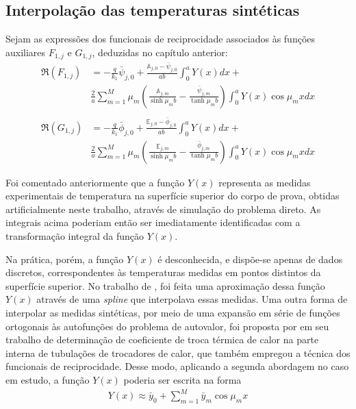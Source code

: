 \subsection{Interpolação das temperaturas sintéticas}\label{secao_interpolacao}
Sejam as expressões dos funcionais de reciprocidade associados às funções auxiliares $F_{1, j}$ e $G_{1, j}$, deduzidas no capítulo anterior:
\begin{align}
\Re(F_{1,j})
& =
-\frac{q}{k_1}\bar{\psi}_{j,0} + \frac{\mathbb{A}_{j,0} - \bar{\psi}_{j,0}}{ab}\int_0^a Y(x)dx + \nonumber \\
& \frac{2}{a}\sum_{m=1}^M \mu_m \left(\frac{\mathbb{A}_{j,m}}{\sinh\mu_m b} - \frac{\bar{\psi}_{j, m}}{\tanh\mu_m b}\right)\int_0^a Y(x)\cos\mu_m x dx
\label{calculo_FR_F1_antes_a} \\ \nonumber \\
\Re(G_{1,j})
& =
-\frac{q}{k_1}\bar{\phi}_{j,0} + \frac{\mathbb{E}_{j,0} - \bar{\phi}_{j,0}}{ab}\int_0^a Y(x)dx + \nonumber \\
& \frac{2}{a}\sum_{m=1}^M \mu_m \left(\frac{\mathbb{E}_{j,m}}{\sinh\mu_m b} - \frac{\bar{\phi}_{j, m}}{\tanh\mu_m b}\right)\int_0^a Y(x)\cos\mu_m x dx
\label{calculo_FR_G1_antes_a}
\end{align}

Foi comentado anteriormente que a função $Y(x)$ representa as medidas experimentais de temperatura na superfície superior do corpo de prova, obtidas artificialmente neste trabalho, através de simulação do problema direto. As integrais acima poderiam então ser imediatamente identificadas com a transformação integral da função $Y(x)$.

Na prática, porém, a função $Y(x)$ é desconhecida, e dispõe-se apenas de dados discretos, correspondentes às temperaturas medidas em pontos distintos da superfície superior. No trabalho de \cite{tese_padilha}, foi feita uma aproximação dessa função $Y(x)$ através de uma \textit{spline} que interpolava essas medidas. Uma outra forma de interpolar as medidas sintéticas, por meio de uma expansão em série de funções ortogonais às autofunções do problema de autovalor, foi proposta por \cite{artigo_mocerino} em seu trabalho de determinação de coeficiente de troca térmica de calor na parte interna de tubulações de trocadores de calor, que também empregou a técnica dos funcionais de reciprocidade. Desse modo, aplicando a segunda abordagem no caso em estudo, a função $Y(x)$ poderia ser escrita na forma
\begin{align}
Y(x) \approx \bar{y}_0 + \sum_{m=1}^M \bar{y}_m \cos\mu_m x \label{aproximacao_Y}
\end{align}

